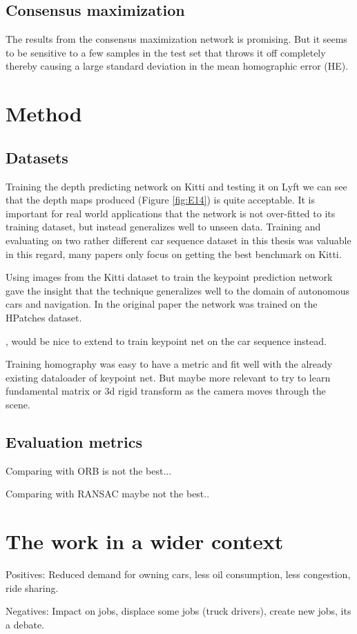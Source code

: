 \subsection{Consensus maximization}

The results from the consensus maximization network is promising. But it seems to be sensitive to a few samples in the test set that throws it off completely thereby causing a large standard deviation in the mean homographic error (HE).

\section{Method}

\subsection{Datasets}

Training the depth predicting network on Kitti and testing it on Lyft we can see that the depth maps produced (Figure \ref{fig:E14}) is quite acceptable. It is important for real world applications that the network is not over-fitted to its training dataset, but instead generalizes well to unseen data. Training and evaluating on two rather different car sequence dataset in this thesis was valuable in this regard, many papers only focus on getting the best benchmark on Kitti.

Using images from the Kitti dataset to train the keypoint prediction network gave the insight that the technique generalizes well to the domain of autonomous cars and navigation. In the original paper the network was trained on the HPatches\cite{hpatches} dataset.

, would be nice to extend to train keypoint net on the car sequence instead.

Training homography was easy to have a metric and fit well with the already existing dataloader of keypoint net. But maybe more relevant to try to learn fundamental matrix or 3d rigid transform as the camera moves through the scene.

\subsection{Evaluation metrics}

Comparing with ORB is not the best...

Comparing with RANSAC maybe not the best..

\section{The work in a wider context}

Positives: Reduced demand for owning cars, less oil consumption, less congestion, ride sharing.\cite{transportation}

Negatives: Impact on jobs, displace some jobs (truck drivers), create new jobs, its a debate.\cite{sociology}